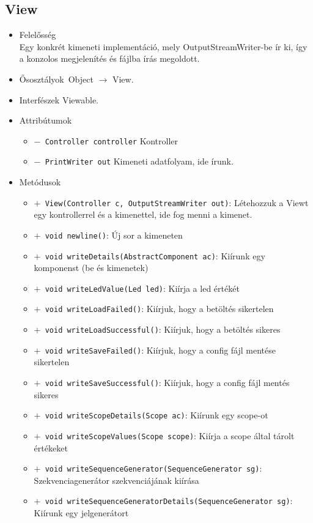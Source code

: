 \subsection{View}
\begin{itemize}
\item Felelősség\\
Egy konkrét kimeneti implementáció, mely OutputStreamWriter-be ír ki,  így a konzolos megjelenítés és fájlba írás megoldott.
\item Ősosztályok\ Object $\rightarrow{}$ View.
\item Interfészek Viewable.
\item Attribútumok $\ $
\begin{itemize}
	\item[] \texttt{$-$ Controller controller} Kontroller
	\item[] \texttt{$-$ PrintWriter out} Kimeneti adatfolyam, ide írunk.
\end{itemize}
\item Metódusok$\ $
\begin{itemize}
	\item[] \texttt{$+$ View(Controller c, OutputStreamWriter out)}: Létehozzuk a Viewt egy kontrollerrel és a kimenettel, ide fog menni a kimenet.
	\item[] \texttt{$+$ void newline()}: Új sor a kimeneten
	\item[] \texttt{$+$ void writeDetails(AbstractComponent ac)}: Kiírunk egy komponenst (be és kimenetek)
	\item[] \texttt{$+$ void writeLedValue(Led led)}: Kiírja a led értékét
	\item[] \texttt{$+$ void writeLoadFailed()}: Kiírjuk, hogy a betöltés sikertelen
	\item[] \texttt{$+$ void writeLoadSuccessful()}: Kiírjuk, hogy a betöltés sikeres
	\item[] \texttt{$+$ void writeSaveFailed()}: Kiírjuk, hogy a config fájl mentése sikertelen
	\item[] \texttt{$+$ void writeSaveSuccessful()}: Kiírjuk, hogy a config fájl mentés sikeres
	\item[] \texttt{$+$ void writeScopeDetails(Scope ac)}: Kiírunk egy scope-ot
	\item[] \texttt{$+$ void writeScopeValues(Scope scope)}: Kiírja a scope által tárolt értékeket
	\item[] \texttt{$+$ void writeSequenceGenerator(SequenceGenerator sg)}: Szekvenciagenerátor szekvenciájának kiírása
	\item[] \texttt{$+$ void writeSequenceGeneratorDetails(SequenceGenerator sg)}: Kiírunk egy jelgenerátort

\end{itemize}
\end{itemize}
